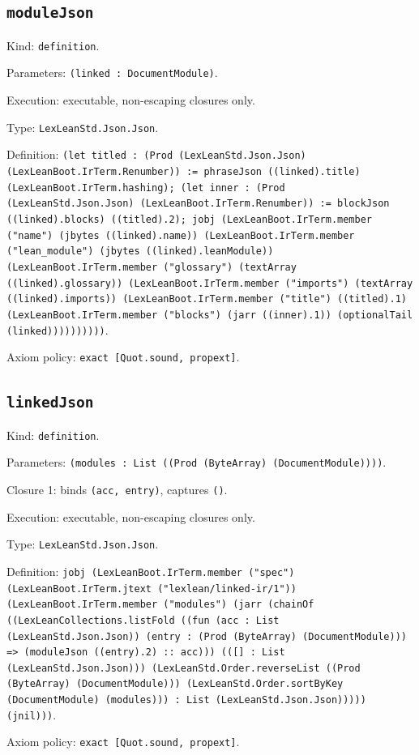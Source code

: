 \documentclass[11pt]{article}
\begin{document}
\subsection*{\texttt{moduleJson}}
\noindent Kind: \texttt{definition}.\par
\noindent Parameters: \texttt{(linked : DocumentModule)}.\par
\noindent Execution: executable, non-escaping closures only.\par
\noindent Type: \texttt{LexLeanStd.Json.Json}.\par
\noindent Definition: \texttt{(let titled : (Prod (LexLeanStd.Json.Json) (LexLeanBoot.IrTerm.Renumber)) := phraseJson ((linked).title) (LexLeanBoot.IrTerm.hashing); (let inner : (Prod (LexLeanStd.Json.Json) (LexLeanBoot.IrTerm.Renumber)) := blockJson ((linked).blocks) ((titled).2); jobj (LexLeanBoot.IrTerm.member ("name") (jbytes ((linked).name)) (LexLeanBoot.IrTerm.member ("lean\_module") (jbytes ((linked).leanModule)) (LexLeanBoot.IrTerm.member ("glossary") (textArray ((linked).glossary)) (LexLeanBoot.IrTerm.member ("imports") (textArray ((linked).imports)) (LexLeanBoot.IrTerm.member ("title") ((titled).1) (LexLeanBoot.IrTerm.member ("blocks") (jarr ((inner).1)) (optionalTail (linked))))))))))}.\par
\noindent Axiom policy: \texttt{exact [Quot.sound, propext]}.\par
\subsection*{\texttt{linkedJson}}
\noindent Kind: \texttt{definition}.\par
\noindent Parameters: \texttt{(modules : List ((Prod (ByteArray) (DocumentModule))))}.\par
\noindent Closure 1: binds \texttt{(acc, entry)}, captures \texttt{()}.\par
\noindent Execution: executable, non-escaping closures only.\par
\noindent Type: \texttt{LexLeanStd.Json.Json}.\par
\noindent Definition: \texttt{jobj (LexLeanBoot.IrTerm.member ("spec") (LexLeanBoot.IrTerm.jtext ("lexlean/linked-ir/1")) (LexLeanBoot.IrTerm.member ("modules") (jarr (chainOf ((LexLeanCollections.listFold ((fun (acc : List (LexLeanStd.Json.Json)) (entry : (Prod (ByteArray) (DocumentModule))) => (moduleJson ((entry).2) :: acc))) (([] : List (LexLeanStd.Json.Json))) (LexLeanStd.Order.reverseList ((Prod (ByteArray) (DocumentModule))) (LexLeanStd.Order.sortByKey (DocumentModule) (modules))) : List (LexLeanStd.Json.Json))))) (jnil)))}.\par
\noindent Axiom policy: \texttt{exact [Quot.sound, propext]}.\par
\end{document}
